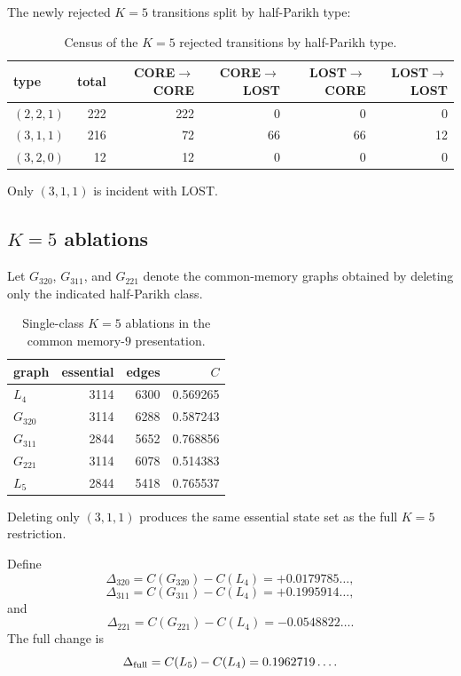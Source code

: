 \documentclass[12pt]{article}
\theoremstyle{definition}
\begin{document}
The newly rejected \(K=5\) transitions split by half-Parikh type:

\begin{table}[h]
\centering
\begin{tabular}{lrrrrr}
\toprule
type & total & CORE\(\to\)CORE & CORE\(\to\)LOST & LOST\(\to\)CORE & LOST\(\to\)LOST \\
\midrule
\((2,2,1)\) & 222 & 222 & 0 & 0 & 0 \\
\((3,1,1)\) & 216 & 72 & 66 & 66 & 12 \\
\((3,2,0)\) & 12 & 12 & 0 & 0 & 0 \\
\bottomrule
\end{tabular}
\caption{Census of the \(K=5\) rejected transitions by half-Parikh type.}
\label{tab:census}
\end{table}

Only \((3,1,1)\) is incident with LOST.

\subsection*{\texorpdfstring{\(K=5\)}{K=5} ablations}

Let \(G_{320}\), \(G_{311}\), and \(G_{221}\) denote the common-memory graphs obtained by deleting only the indicated half-Parikh class.

\begin{table}[h]
\centering
\begin{tabular}{lrrr}
\toprule
graph & essential & edges & \(C\) \\
\midrule
\(L_4\) & 3114 & 6300 & 0.569265 \\
\(G_{320}\) & 3114 & 6288 & 0.587243 \\
\(G_{311}\) & 2844 & 5652 & 0.768856 \\
\(G_{221}\) & 3114 & 6078 & 0.514383 \\
\(L_5\) & 2844 & 5418 & 0.765537 \\
\bottomrule
\end{tabular}
\caption{Single-class \(K=5\) ablations in the common memory-\(9\) presentation.}
\label{tab:ablation}
\end{table}

Deleting only \((3,1,1)\) produces the same essential state set as the full \(K=5\) restriction.

Define
\[
\Delta_{320}=C(G_{320})-C(L_4)=+0.0179785\ldots,
\]
\[
\Delta_{311}=C(G_{311})-C(L_4)=+0.1995914\ldots,
\]
and
\[
\Delta_{221}=C(G_{221})-C(L_4)=-0.0548822\ldots.
\]
The full change is
\[
\Delta_{\rm full}
=
C(L_5)-C(L_4)
=
0.1962719\ldots.
\]
\end{document}
